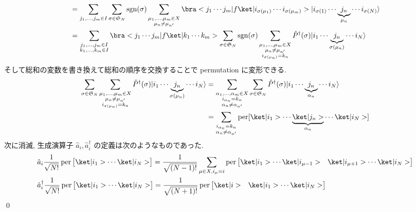 \documentclass[uplatex,dvipdfmx,a4paper,11pt]{jlreq}
\makeatletter
\DeclareMathOperator{\sgn}{sgn}
\DeclareMathOperator{\per}{per}
\renewcommand{\SS}{\mathfrak{S}}
\numberwithin{equation}{section}
\theoremstyle{definition}
\renewenvironment{proof}[1][\proofname]{\par
  \normalfont
  \topsep6\p@\@plus6\p@ \trivlist
  \item[\hskip\labelsep{\bfseries #1}\@addpunct{\bfseries}]\ignorespaces\quad\par
}{%
  \qed\endtrivlist\@endpefalse
}
\renewcommand\proofname{証明}
\makeatother
\begin{document}
\begin{proof}
\begin{align}
     & = \sum_{j_1,\ldots,j_m\in I}\sum_{\sigma\in\SS_N}\sgn(\sigma)\sum_{\substack{\mu_1,\ldots,\mu_m\in X \\ \mu_n \neq \mu_{n'}}}\bra<j_1\cdots j_m|f\ket|i_{\sigma(\mu_1)}\cdots i_{\sigma(\mu_m)}>|i_{\sigma(1)}\cdots\underbrace{j_n}_{\mu_n}\cdots i_{\sigma(N)}\rangle \\
     & = \sum_{\substack{j_1,\ldots,j_m\in I                                                                \\ k_1,\ldots,k_m\in I}}\bra<j_1\cdots j_m|f\ket|k_1\cdots k_m>\sum_{\sigma\in\SS_N}\sgn(\sigma)\sum_{\substack{\mu_1,\ldots,\mu_m\in X     \\ \mu_n\neq\mu_{n'} \\ i_{\sigma(\mu_n)} = k_n}}\hat{P}^\dagger(\sigma)|i_1\cdots\underbrace{j_n}_{\sigma(\mu_n)}\cdots i_N\rangle
  \end{align}
  そして総和の変数を書き換えて総和の順序を交換することで permutation に変形できる.
  \begin{align}
    \sum_{\sigma\in\SS_N}\sum_{\substack{\mu_1,\ldots,\mu_m\in X \\ \mu_n\neq\mu_{n'} \\ i_{\sigma(\mu_n)} = k_n}}\hat{P}^\dagger(\sigma)|i_1\cdots\underbrace{j_n}_{\sigma(\mu_n)}\cdots i_N\rangle & = \sum_{\substack{\alpha_1,\ldots,\alpha_m\in X \\ i_{\alpha_n} = k_n \\ \alpha_n\neq\alpha_{n'}}}\sum_{\sigma\in\SS_N}\hat{P}^\dagger(\sigma)|i_1\cdots\underbrace{j_n}_{\alpha_n}\cdots i_N\rangle \\
     & = \sum_{\substack{i_{\alpha_n} = k_n                      \\ \alpha_n\neq\alpha_{n'}}}\per[\ket|i_1>\cdots\underbrace{\ket|j_n>}_{\alpha_n}\cdots\ket|i_N>]
  \end{align}
  次に消滅, 生成演算子 $\hat{a}_i, \hat{a}_i^\dagger$ の定義は次のようなものであった.
  \begin{align}
     & \hat{a}_i\frac{1}{\sqrt{N!}}\per\begin{bmatrix}\ket|i_1> \cdots \ket|i_N>\end{bmatrix} = \frac{1}{\sqrt{(N-1)!}}\sum_{\mu\in X, i_\mu = i}\per\begin{bmatrix}\ket|i_1> \cdots \ket|i_{\mu - 1}> & \ket|i_{\mu + 1}> \cdots \ket|i_N>\end{bmatrix} \\
     & \hat{a}_i^\dagger\frac{1}{\sqrt{N!}}\per\begin{bmatrix}\ket|i_1> \cdots \ket|i_N>\end{bmatrix} = \frac{1}{\sqrt{(N+1)!}}\per\begin{bmatrix}\ket|i> & \ket|i_1> \cdots \ket|i_N>\end{bmatrix}

\end{align}
\end{proof}
\end{document}
